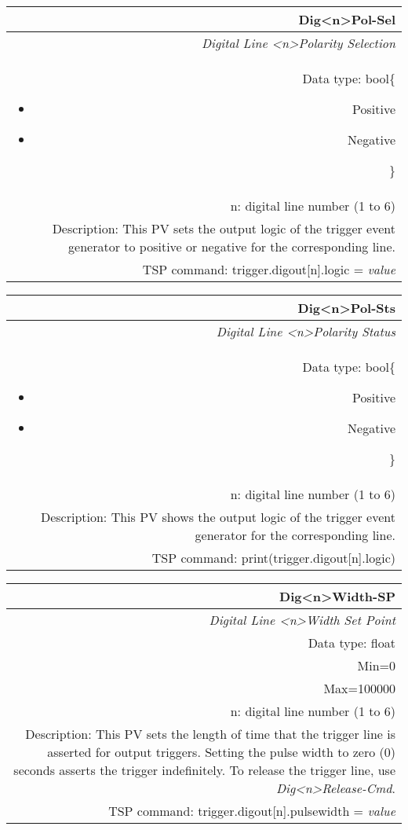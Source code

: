 \documentclass[openany]{article}
\begin{document}
		\begin{tabular}{N}
			\hline
			\bfseries Dig{\textless n\textgreater}Pol-Sel\label{pv:digpol-sel} \\ \hline
			\emph{Digital Line \textless n\textgreater Polarity Selection} \\
			Data type: bool\{\begin{itemize}[noitemsep]
				\small
				\item[] Positive
				\item[] Negative
			\end{itemize}\} \\
			n: digital line number (1 to 6) \\
			Description: This PV sets the output logic of the trigger event generator to positive or negative for the corresponding line. \\
			TSP command: trigger.digout[n].logic = \emph{value}
		\end{tabular}

		\begin{tabular}{N}
			\hline
			\bfseries Dig{\textless n\textgreater}Pol-Sts\label{pv:digpol-sts} \\ \hline
			\emph{Digital Line \textless n\textgreater Polarity Status} \\
			Data type: bool\{\begin{itemize}[noitemsep]
				\small
				\item[] Positive
				\item[] Negative
			\end{itemize}\} \\
			n: digital line number (1 to 6) \\
			Description: This PV shows the output logic of the trigger event generator for the corresponding line. \\
			TSP command: print(trigger.digout[n].logic)
		\end{tabular}

		\begin{tabular}{N}
			\hline
			\bfseries Dig{\textless n\textgreater}Width-SP\label{pv:digwidth-sp} \\ \hline
			\emph{Digital Line \textless n\textgreater Width Set Point} \\
			Data type: float \\
			Min=0 \\
			Max=100000 \\
			n: digital line number (1 to 6) \\
			Description: This PV sets the length of time that the trigger line is asserted for output triggers. Setting the pulse width to zero (0) seconds asserts the trigger indefinitely. To release the trigger line, use \emph{Dig{\textless n\textgreater}Release-Cmd}. \\
			TSP command: trigger.digout[n].pulsewidth = \emph{value}
		\end{tabular}
\end{document}

